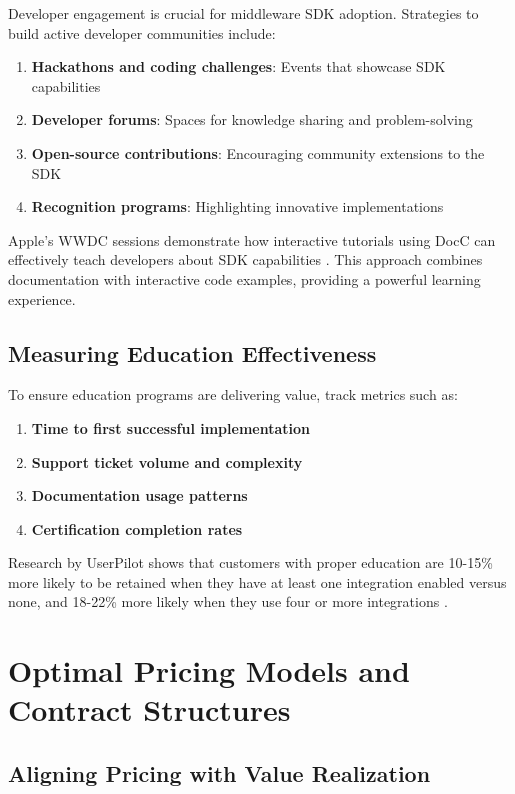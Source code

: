 \documentclass[11pt,a4paper]{article}
\begin{document}
Developer engagement is crucial for middleware SDK adoption. Strategies to build active developer communities include:

\begin{enumerate}
    \item \textbf{Hackathons and coding challenges}: Events that showcase SDK capabilities
    \item \textbf{Developer forums}: Spaces for knowledge sharing and problem-solving
    \item \textbf{Open-source contributions}: Encouraging community extensions to the SDK
    \item \textbf{Recognition programs}: Highlighting innovative implementations
\end{enumerate}

Apple's WWDC sessions demonstrate how interactive tutorials using DocC can effectively teach developers about SDK capabilities \cite{apple2021}. This approach combines documentation with interactive code examples, providing a powerful learning experience.

\subsection{Measuring Education Effectiveness}

To ensure education programs are delivering value, track metrics such as:

\begin{enumerate}
    \item \textbf{Time to first successful implementation}
    \item \textbf{Support ticket volume and complexity}
    \item \textbf{Documentation usage patterns}
    \item \textbf{Certification completion rates}
\end{enumerate}

Research by UserPilot shows that customers with proper education are 10-15\% more likely to be retained when they have at least one integration enabled versus none, and 18-22\% more likely when they use four or more integrations \cite{userpilot2023}.

\section{Optimal Pricing Models and Contract Structures}

\subsection{Aligning Pricing with Value Realization}
\end{document}
